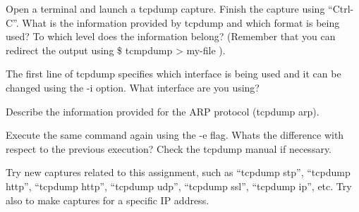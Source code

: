 Open a terminal and launch a tcpdump capture.
Finish the capture using ``Ctrl-C''.
What is the information provided by tcpdump and which format is being used?
To which level does the information belong?
(Remember that you can redirect the output using \$ tcmpdump > my-file ).

The first line of tcpdump specifies which interface is being used and it can be changed using the -i option.
What interface are you using?

Describe the information provided for the ARP protocol (tcpdump arp).

Execute the same command again using the -e flag.
Whats the difference with respect to the previous execution?
Check the tcpdump manual if necessary.

Try new captures related to this assignment, such as ``tcpdump stp'', ``tcpdump http'', ``tcpdump http'', ``tcpdump udp'', ``tcpdump ssl'', ``tcpdump ip'', etc.
Try also to make captures for a specific IP address.
